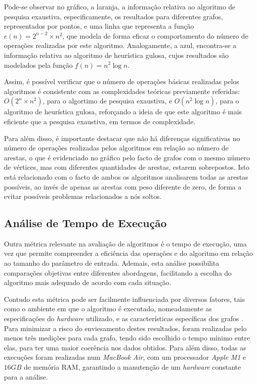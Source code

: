 \documentclass[mirror]{revdetua}
\begin{document}
Pode-se observar no gráfico, a laranja, a informação relativa ao algoritmo de pesquisa exaustiva, especificamente, os resultados para diferentes grafos, representados por pontos, e uma linha que representa a função $e(n) = 2^{n-2} \times n^2$, que modela de forma eficaz o comportamento do número de operações realizadas por este algoritmo. Analogamente, a azul, encontra-se a informação relativa ao algoritmo de heurística gulosa, cujos resultados são modelados pela função $f(n) = n^2 \log n$.

Assim, é possível verificar que o número de operações básicas realizadas pelos algoritmos é consistente com as complexidades teóricas previamente referidas: $O(2^n \times n^2)$, para o algortimo de pesquisa exaustiva, e $O(n^2 \log n)$, para o algoritmo de heurística gulosa, reforçando a ideia de que este algoritmo é mais eficiente que a pesquisa exaustiva, em termos de complexidade.

Para além disso, é importante destacar que não há diferenças significativas no número de operações realizadas pelos algoritmos em relação ao número de arestas, o que é evidenciado no gráfico pelo facto de grafos com o mesmo número de vértices, mas com diferentes quantidades de arestas, estarem sobrepostos. Isto está relacionado com o facto de ambos os algoritmos analisarem todas as arestas possíveis, ao invés de apenas as arestas com peso diferente de zero, de forma a evitar possíveis problemas relacionados a nós soltos.


\subsection{Análise de Tempo de Execução}

Outra métrica relevante na avaliação de algoritmos é o tempo de execução, uma vez que permite compreender a eficiência das operações e do algoritmo em relação ao tamanho do parâmetro de entrada. Ademais, esta análise possibilita comparações objetivas entre diferentes abordagens, facilitando a escolha do algoritmo mais adequado de acordo com cada situação.

Contudo esta métrica pode ser facilmente influenciada por diversos fatores, tais como o ambiente em que o algoritmo é executado, nomeadamente as especificações do \textit{hardware} utilizado, e as características específicas dos grafos \cite{NP15}. Para minimizar a risco do enviesamento destes resultados, foram realizadas pelo menos três medições para cada grafo, tendo sido escolhido o tempo mínimo entre elas, para ter uma maior coerência nos dados obtidos. Para além disso, todas as execuções foram realizadas num \textit{MacBook Air}, com um processador \textit{Apple M1} e $16GB$ de memória RAM, garantindo a manutenção de um \textit{hardware} constante para a análise.
\end{document}
